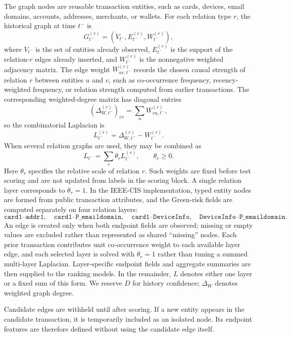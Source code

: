 \documentclass[11pt]{article}
\theoremstyle{definition}
\theoremstyle{remark}
\begin{document}
The graph nodes are reusable transaction entities, such as cards, devices, email domains, accounts, addresses, merchants, or wallets. For each relation type $r$, the historical graph at time $t^-$ is
\[
    G_{t^-}^{(r)}=(V_{t^-},E_{t^-}^{(r)},W_{t^-}^{(r)}),
\]
where $V_{t^-}$ is the set of entities already observed, $E_{t^-}^{(r)}$ is the support of the relation-$r$ edges already inserted, and $W_{t^-}^{(r)}$ is the nonnegative weighted adjacency matrix. The edge weight $W_{uv,t^-}^{(r)}$ records the chosen causal strength of relation $r$ between entities $u$ and $v$, such as co-occurrence frequency, recency-weighted frequency, or relation strength computed from earlier transactions. The corresponding weighted-degree matrix has diagonal entries
\[
    (\Delta_{W,t^-}^{(r)})_{vv}=\sum_u W_{vu,t^-}^{(r)},
\]
so the combinatorial Laplacian is
\[
    L_{t^-}^{(r)}=\Delta_{W,t^-}^{(r)}-W_{t^-}^{(r)}.
\]
When several relation graphs are used, they may be combined as
\begin{equation}
    L_{t^-}=\sum_r \theta_r L_{t^-}^{(r)},\qquad \theta_r\ge 0.
    \label{eq:relation-layers}
\end{equation}
Here $\theta_r$ specifies the relative scale of relation $r$. Such weights are fixed before test scoring and are not updated from labels in the scoring block. A single relation layer corresponds to $\theta_r=1$. In the IEEE-CIS implementation, typed entity nodes are formed from public transaction attributes, and the Green-risk fields are computed separately on four relation layers:
\[
    \texttt{card1--addr1},\quad
    \texttt{card1--P\_emaildomain},\quad
    \texttt{card1--DeviceInfo},\quad
    \texttt{DeviceInfo--P\_emaildomain}.
\]
An edge is created only when both endpoint fields are observed; missing or empty values are excluded rather than represented as shared ``missing'' nodes. Each prior transaction contributes unit co-occurrence weight to each available layer edge, and each selected layer is solved with $\theta_r=1$ rather than tuning a summed multi-layer Laplacian. Layer-specific endpoint fields and aggregate summaries are then supplied to the ranking models. In the remainder, $L$ denotes either one layer or a fixed sum of this form. We reserve $D$ for history confidence; $\Delta_W$ denotes weighted graph degree.

Candidate edges are withheld until after scoring. If a new entity appears in the candidate transaction, it is temporarily included as an isolated node. Its endpoint features are therefore defined without using the candidate edge itself.
\end{document}
